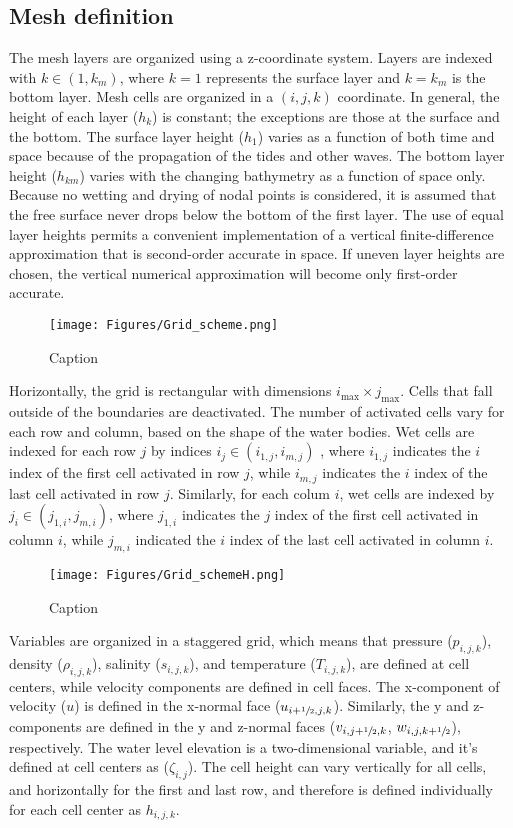 \subsection{Mesh definition}
The mesh layers are organized using a z-coordinate system. Layers are indexed with $k\in (1,k_m)$, where $k=1$ represents the surface layer and $k=k_m$ is the bottom layer. Mesh cells are organized in a $(i,j,k)$ coordinate. In general, the height of each layer ($h_k$) is constant; the exceptions are those at the surface and the bottom. The surface layer height ($h_1$) varies as a function of both time and space because of the propagation of the tides and other waves. The bottom layer height ($h_{km}$) varies with the changing bathymetry as a function of space only. Because no wetting and drying of nodal points is considered, it is assumed that the free surface never drops below the bottom of the first layer. The use of equal layer heights permits a convenient implementation of a vertical finite-difference approximation that is second-order accurate in space. If uneven layer heights are chosen, the vertical numerical approximation will become only first-order accurate.

\begin{figure}[h!]
    \centering
    \texttt{[image: Figures/Grid\_scheme.png]}
    \caption{Caption}
    \label{fig:grid_schemeV}
\end{figure}

Horizontally, the grid is rectangular with dimensions $i_{\max}\times j_{\max}$. Cells that fall outside of the boundaries are deactivated. The number of activated cells vary for each row and column, based on the shape of the water bodies. Wet cells are indexed for each row $j$ by indices $i_j \in (i_{1,j},i_{m,j})$ , where $i_{1,j}$ indicates the $i$ index of the first cell activated in row $j$, while $i_{m,j}$ indicates the $i$ index of the last cell activated in row $j$. Similarly, for each colum $i$, wet cells are indexed by $j_i \in (j_{1,i},j_{m,i})$, where $j_{1,i}$ indicates the $j$ index of the first cell activated in column $i$, while $j_{m,i}$ indicated the $i$ index of the last cell activated in column $i$.

\begin{figure}[h!]
    \centering
    \texttt{[image: Figures/Grid\_schemeH.png]}
    \caption{Caption}
    \label{fig:grid_schemeH}
\end{figure}

Variables are organized in a staggered grid, which means that pressure ($p_{i,j,k}$), density ($\rho_{i,j,k}$), salinity ($s_{i,j,k}$), and temperature ($T_{i,j,k}$), are defined at cell centers, while velocity components are defined in cell faces.  The x-component of velocity ($u$) is defined in the x-normal face ($u_{i+\sfrac{1}{2},j,k}$). Similarly, the y and z-components are defined in the y and z-normal faces ($v_{i,j+\sfrac{1}{2},k}$, $w_{i,j,k+\sfrac{1}{2}}$), respectively. The water level elevation is a two-dimensional variable, and it's defined at cell centers as ($\zeta_{i,j}$). The cell height can vary vertically for all cells, and horizontally for the first and last row, and therefore is defined individually for each cell center as $h_{i,j,k}$.


